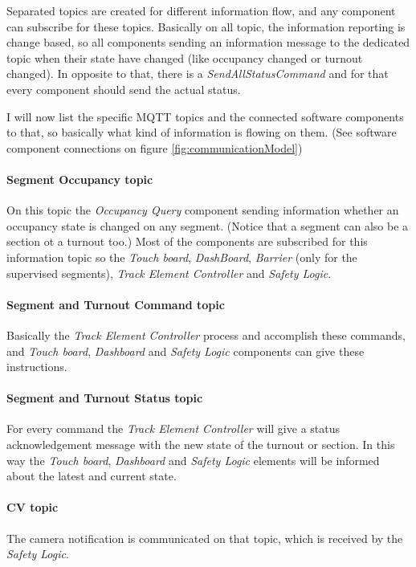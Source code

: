Separated topics are created for different information flow, and any component can subscribe for these topics. Basically on all topic, the information reporting is change based, so all components sending an information message to the dedicated topic when their state have changed (like occupancy changed or turnout changed). In opposite to that, there is a \textit{SendAllStatusCommand} and for that every component should send the actual status.

I will now list the specific MQTT topics and the connected software components to that, so basically what kind of information is flowing on them. (See software component connections on figure \ref{fig:communicationModel})

\paragraph{Segment Occupancy topic}
On this topic the \textit{Occupancy Query} component sending information whether an occupancy state is changed on any segment. (Notice that a segment can also be a section ot a turnout too.) Most of the components are subscribed for this information topic so the \textit{Touch board}, \textit{DashBoard}, \textit{Barrier} (only for the supervised segments), \textit{Track Element Controller} and \textit{Safety Logic}.

\paragraph{Segment and Turnout Command topic}\label{par:MQTTTopicCommand}
Basically the \textit{Track Element Controller} process and accomplish these commands, and \textit{Touch board}, \textit{Dashboard} and \textit{Safety Logic} components can give these instructions.

\paragraph{Segment and Turnout Status topic}\label{par:MQTTTopicStatus}
For every command the \textit{Track Element Controller} will give a status acknowledgement message with the new state of the turnout or section. In this way the \textit{Touch board}, \textit{Dashboard} and \textit{Safety Logic} elements will be informed about the latest and current state.

\paragraph{CV topic}
The camera notification is communicated on that topic, which is received by the \textit{Safety Logic}.

